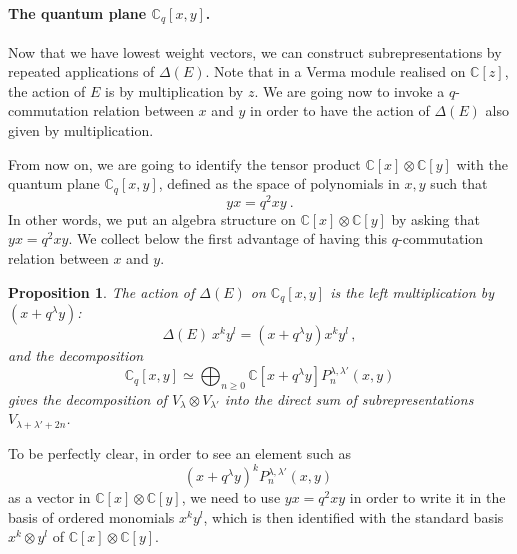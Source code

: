 \documentclass[a4paper,12pt]{article}
\numberwithin{equation}{section}
\newcommand{\C}{\mathbb{C}}
\newtheorem{prop}[theo]{Proposition}
\theoremstyle{rem}
\theoremstyle{definition}
\begin{document}
\paragraph{The quantum plane $\C_q[x,y]$.} Now that we have lowest weight vectors, we can construct subrepresentations by repeated applications of $\Delta(E)$. Note that in a Verma module realised on $\C[z]$, the action of $E$ is by multiplication by $z$. We are going now to invoke a $q$-commutation relation between $x$ and $y$ in order to have the action of $\Delta(E)$ also given by multiplication.

From now on, we are going to identify the tensor product $\C[x]\otimes \C[y]$ with the quantum plane $\C_q[x,y]$,  defined as the space of polynomials in $x,y$ such that 
\begin{equation}\label{quantumplane}
yx=q^2xy\ .
\end{equation}
In other words, we put an algebra structure on $\C[x]\otimes \C[y]$ by asking that $yx=q^2xy$. We collect below the first advantage of having this $q$-commutation relation between $x$ and $y$.
\begin{prop}\label{propdeltaEanddecomposition}
The action of $\Delta(E)$ on $\C_q[x,y]$ is the left multiplication by $(x+q^{\lambda}y)$:
\begin{equation}
\Delta(E)~x^ky^l=(x+q^{\lambda}y)x^{k}y^l\,,\label{actExymult}
\end{equation}
and the decomposition 
\begin{equation}\C_q[x,y]\simeq \bigoplus_{n\geq0} \C[x+q^\lambda y] P_n^{\lambda,\lambda'}(x,y)\label{decxy} \end{equation}
gives the decomposition of $V_\lambda\otimes V_{\lambda'}$ into the direct sum of subrepresentations $V_{\lambda+\lambda'+2n}$.

\end{prop}
To be perfectly clear, in order to see an element such as
\[(x+q^{\lambda}y)^kP_n^{\lambda,\lambda'}(x,y)\ \]
as a vector in $\C[x]\otimes \C[y]$, we need to use $yx=q^2xy$ in order to write it in the basis of ordered monomials $x^ky^l$, which is then identified with the standard basis $x^k\otimes y^l$ of $\C[x]\otimes \C[y]$.
\end{document}
